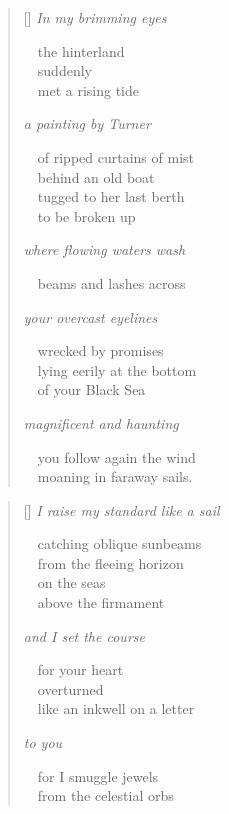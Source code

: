 \documentclass[14pt]{extbook}
\newcommand*{\centeredornament}{\centerline{\pgfornament[width=6cm]{88}}}
\begin{document}
\newpage

\vspace*{-15mm}
\centeredornament
\vspace*{-7mm}


\settowidth{\versewidth}{\ \ you follow again the wind}

\begin{verse}[\versewidth]
  \emph{In my brimming eyes}

  \ \ the hinterland \\
  \ \ suddenly \\
  \ \ met a rising tide

  \emph{a painting by Turner}

  \ \ of ripped curtains of mist \\
  \ \ behind an old boat \\
  \ \ tugged to her last berth \\
  \ \ to be broken up

  \emph{where flowing waters wash}

  \ \ beams and lashes across

  \emph{your overcast eyelines}

  \ \ wrecked by promises \\
  \ \ lying eerily at the bottom \\
  \ \ of your Black Sea

  \emph{magnificent and haunting}

  \ \ you follow again the wind \\
  \ \ moaning in faraway sails.
\end{verse}


\newpage

\vspace*{-15mm}
\centeredornament
\vspace*{-7mm}



\begin{verse}[\versewidth]
  \emph{I raise my standard like a sail}

  \ \ catching oblique sunbeams \\
  \ \ from the fleeing horizon \\
  \ \ on the seas \\
  \ \ above the firmament

  \emph{and I set the course}

  \ \ for your heart \\
  \ \ overturned \\
  \ \ like an inkwell on a letter

  \emph{to you}

  \ \ for I smuggle jewels \\
  \ \ from the celestial orbs
\end{verse}
\end{document}
